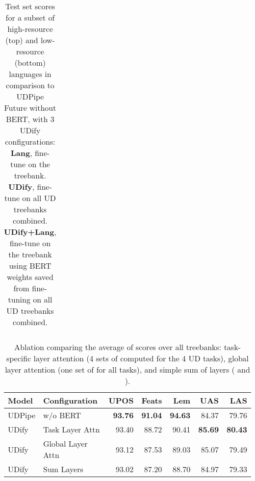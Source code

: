 \documentclass[11pt,a4paper]{article}
\begin{document}
\begin{table}[!t]
\begin{center}
\begin{tabularx}{\linewidth}{@{}Xlrrrrr@{}}
    \bottomrule
    \end{tabularx}
    \end{center}
    \caption{\label{table:main-results} 
        Test set scores for a subset of high-resource (top) and low-resource (bottom) languages in comparison to UDPipe Future without BERT, with 3 UDify configurations:
        {\bf Lang}, fine-tune on the treebank.
        {\bf UDify}, fine-tune on all UD treebanks combined.
        {\bf UDify+Lang}, fine-tune on the treebank using BERT weights saved from fine-tuning on all UD treebanks combined.
    }
\end{table}

\begin{table}[!ht]
    \fontsize{8}{10}\selectfont
    \begin{center}
    \setlength{\tabcolsep}{3pt}
    \begin{tabularx}{\linewidth}{@{}lXrrrrr@{}}
    \toprule
        \sc Model & \sc Configuration & \sc UPOS & \sc Feats & \sc Lem & \sc UAS & \sc LAS \\
    \midrule
    UDPipe & w/o BERT          & \bf 93.76 & \bf 91.04 & \bf 94.63 &     84.37 &     79.76 \\
    \addlinespace
    UDify  & Task Layer Attn   &     93.40 &     88.72 &     90.41 & \bf 85.69 & \bf 80.43 \\
    UDify  & Global Layer Attn &     93.12 &     87.53 &     89.03 &     85.07 &     79.49 \\
    UDify  & Sum Layers        &     93.02 &     87.20 &     88.70 &     84.97 &     79.33 \\
    \bottomrule
    \end{tabularx}
    \end{center}
    \caption{\label{table:results-ablation}
        Ablation comparing the average of scores over all treebanks: task-specific layer attention (4 sets of  computed for the 4 UD tasks), global layer attention (one set of  for all tasks), and simple sum of layers ( and ).
    }
\end{table}
\end{document}
